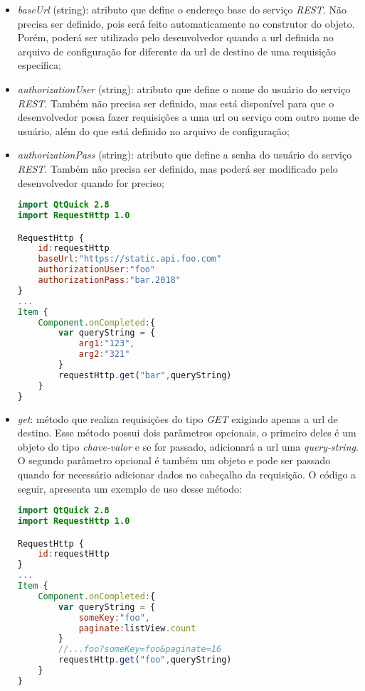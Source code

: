 \begin{itemize}
	\item \textit{baseUrl} (string): atributo que define o endereço base do serviço \textit{REST}. Não precisa ser definido, pois será feito automaticamente no construtor do objeto. Porém, poderá ser utilizado pelo desenvolvedor quando a url definida no arquivo de configuração for diferente da url de destino de uma requisição específica;

	\item \textit{authorizationUser} (string): atributo que define o nome do usuário do serviço \textit{REST}. Também não precisa ser definido, mas está disponível para que o desenvolvedor possa fazer requisições a uma url ou serviço com outro nome de usuário, além do que está definido no arquivo de configuração;

	\item \textit{authorizationPass} (string): atributo que define a senha do usuário do serviço \textit{REST}. Também não precisa ser definido, mas poderá ser modificado pelo desenvolvedor quando for preciso;

\begin{center}
\begin{lstlisting}[language=qml]
import QtQuick 2.8
import RequestHttp 1.0

RequestHttp {
	id:requestHttp
	baseUrl:"https://static.api.foo.com"
	authorizationUser:"foo"
	authorizationPass:"bar.2018"
}
...
Item {
	Component.onCompleted:{
		var queryString = {
			arg1:"123",
			arg2:"321"
		}
		requestHttp.get("bar",queryString)
	}
}
\end{lstlisting}
\end{center}

	\item \textit{get}: método que realiza requisições do tipo \textit{GET} exigindo apenas a url de destino. Esse método possui dois parâmetros opcionais, o primeiro deles é um objeto do tipo \textit{chave-valor} e se for passado, adicionará a url uma \textit{query-string}. O segundo parâmetro opcional é também um objeto e pode ser passado quando for necessário adicionar dados no cabeçalho da requisição. O código a seguir, apresenta um exemplo de uso desse método:
\begin{center}
\begin{lstlisting}[language=qml]
import QtQuick 2.8
import RequestHttp 1.0

RequestHttp {
	id:requestHttp
}
...
Item {
	Component.onCompleted:{
		var queryString = {
			someKey:"foo",
			paginate:listView.count
		}
		//...foo?someKey=foo&paginate=16
		requestHttp.get("foo",queryString)
	}
}
\end{lstlisting}
\end{center}


\end{itemize}
